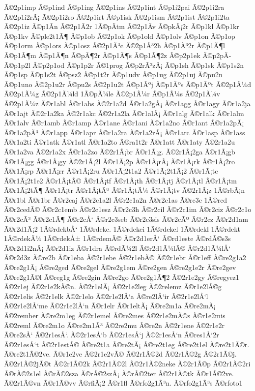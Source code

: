 {Ã©2p1imp
Ã©p1ind
Ã©p1ing
Ã©2p1ins
Ã©2p1int
Ã©p1i2pai
Ã©2p1i2ra
Ã©2p1i2rÃ¡
Ã©2p1i2ro
Ã©2p1irt
Ã©p1isk
Ã©2p1ism
Ã©2p1ist
Ã©2p1i2ta
Ã©2p1iz
Ã©p1Ã­n
Ã©2p1Ã­2r
1Ã©pÃ­tm
Ã©2p1Ã­v
Ã©pkÃ¡2r
Ã©p1kl
Ã©p1kr
Ã©p1kv
Ã©ple2t1Ã¶
Ã©p1ob
Ã©2p1ok
Ã©p1old
Ã©p1olv
Ã©p1on
Ã©p1op
Ã©p1orm
Ã©p1ors
Ã©p1osz
Ã©2p1Ã³c
Ã©2p1Ã³2h
Ã©p1Ã³2r
Ã©p1Ã¶l
Ã©p1Ã¶m
Ã©p1Ã¶n
Ã©pÃ¶2r
Ã©p1Ã¶s
Ã©p1Ã¶2z
Ã©p2p1ek
Ã©p2pÃ­
Ã©p1p2l
Ã©p2p1od
Ã©p1p2r
Ã©1prog
Ã©p2rÃ³zÃ¡
Ã©p1sh
Ã©p1sk
Ã©p1s2n
Ã©p1sp
Ã©p1s2t
Ã©psz2
Ã©p1t2r
Ã©p1udv
Ã©p1ug
Ã©2p1uj
Ã©pu2n
Ã©p1uno
Ã©2p1u2r
Ã©pu2s
Ã©2p1u2t
Ã©p1Ãºj
Ã©p1Ãºs
Ã©p1Ãºt
Ã©2p1Ã¼d
Ã©2p1Ã¼g
Ã©2p1Ã¼ld
1Ã©pÃ¼le
Ã©2p1Ã¼r
Ã©p1Ã¼s
Ã©2p1Ã¼v
Ã©2p1Ã¼z
Ã©r1abl
Ã©r1abs
Ã©2r1a2d
Ã©r1a2gÃ¡
Ã©r1agg
Ã©r1agy
Ã©r1a2ja
Ã©r1ajt
Ã©2r1a2ka
Ã©2r1akc
Ã©2r1a2la
Ã©r1alÃ¡
Ã©r1alg
Ã©r1alk
Ã©r1alm
Ã©r1alv
Ã©r1amb
Ã©r1amp
Ã©r1ane
Ã©r1ani
Ã©r1a2no
Ã©r1ant
Ã©r1a2pÃ¡
Ã©r1a2pÃ³
Ã©r1app
Ã©r1apr
Ã©r1a2ra
Ã©r1a2rÃ¡
Ã©r1arc
Ã©r1asp
Ã©r1ass
Ã©r1a2ti
Ã©r1atk
Ã©r1atl
Ã©r1a2to
Ã©ra1t2r
Ã©r1att
Ã©r1aty
Ã©2r1a2u
Ã©r1a2va
Ã©2r1a2x
Ã©r1a2zo
Ã©2r1Ã¡br
Ã©r1Ã¡g.
Ã©2r1Ã¡2ga
Ã©r1Ã¡gb
Ã©r1Ã¡gg
Ã©r1Ã¡gy
Ã©2r1Ã¡2l
Ã©r1Ã¡2p
Ã©r1Ã¡rÃ¡
Ã©r1Ã¡rk
Ã©r1Ã¡2ro
Ã©r1Ã¡rp
Ã©r1Ã¡rr
Ã©r1Ã¡2ru
Ã©r1Ã¡2t1a2
Ã©r1Ã¡2t1Ã¡2
Ã©r1Ã¡tc
Ã©r1Ã¡2t1e2
Ã©r1Ã¡tÃ©
Ã©r1Ã¡tf
Ã©r1Ã¡th
Ã©r1Ã¡tj
Ã©r1Ã¡tl
Ã©r1Ã¡tm
Ã©r1Ã¡2tÃ¶
Ã©r1Ã¡tr
Ã©r1Ã¡tÃº
Ã©r1Ã¡tÃ¼
Ã©r1Ã¡tv
Ã©2r1Ã¡z
1Ã©rbÃ¡n
Ã©r1bl
Ã©r1br
Ã©r2caj
Ã©r2c1a2l
Ã©r2c1a2n
Ã©r2c1as
Ã©rc3c
1Ã©rcd
Ã©r2cedÃ©
Ã©r2c1emb
Ã©r2c1esz
Ã©r2c3h
Ã©r2cil
Ã©r2c1im
Ã©r2ciz
Ã©r2c1o
Ã©r2cÃ³
Ã©r2c1Ã¶
Ã©r2cÅ‘
Ã©r2c3seb
Ã©r2c3sis
Ã©r2cÃº
Ã©r2cz
Ã©r2d1am
Ã©r2d1Ã¡2
1Ã©rdekbÅ‘
1Ã©rdeke.
1Ã©rdekei
1Ã©rdekel
1Ã©rdekl
1Ã©rdekt
1Ã©rdekÃ¼
1Ã©rdekÅ±
1Ã©rdemÃ©
Ã©r2d1erÅ‘
Ã©rd1este
Ã©rdÃ©s3s
Ã©r2d1i2nÃ¡
Ã©r2d1iz
Ã©r1dra
Ã©rdÃ¼2l
Ã©r2d1Ã¼lÃ©
Ã©r2d1Ã¼lÅ‘
Ã©r2d3z
Ã©re2b
Ã©r1eba
Ã©2r1ebe
Ã©2r1ebÃ©
Ã©2r1ebr
Ã©r1eff
Ã©re2g1a2
Ã©re2g1Ã¡
Ã©re2ged
Ã©re2gel
Ã©re2g1em
Ã©re2gen
Ã©re2g1e2r
Ã©re2gev
Ã©re2g1Ã©l
Ã©reg1g
Ã©re2gin
Ã©re2go
Ã©re2g1Ã¶2
Ã©2r1e2gy
Ã©regyez1
Ã©2r1ej
Ã©2r1e2kÃ©n.
Ã©2r1elÃ¡
Ã©2r1e2leg
Ã©2relemz
Ã©r1e2lÃ©g
Ã©2r1elis
Ã©2r1elk
Ã©2r1elo
Ã©2r1e2lÅ‘a
Ã©re2lÅ‘ir
Ã©2r1e2lÅ‘l
Ã©2r1e2lÅ‘me
Ã©2r1e2lÅ‘n
Ã©r1elr
Ã©r1eltÃ¡
Ã©re2m1a
Ã©re2mÃ¡
Ã©2rember
Ã©re2m1eg
Ã©2r1emel
Ã©re2mes
Ã©2r1e2mÃ©s
Ã©r1e2mis
Ã©2reml
Ã©re2m1o
Ã©re2m1Ã³
Ã©2re2mu
Ã©re2n
Ã©2r1ene
Ã©2r1e2r
Ã©re2sÅ‘
Ã©2r1esÅ‘.
Ã©2r1esÅ‘b
Ã©2r1esÅ‘j
Ã©2r1esÅ‘n
Ã©res1Å‘2r
Ã©2r1esÅ‘t
Ã©2r1estÃ©
Ã©re2t1a
Ã©re2tÃ¡
Ã©re2t1eg
Ã©re2t1el
Ã©re2t1Ã©r.
Ã©re2t1Ã©2ve.
Ã©r1e2ve
Ã©2r1e2vÃ©
Ã©2r1Ã©2d
Ã©2r1Ã©2g
Ã©2r1Ã©j.
Ã©2r1Ã©2jÃ©t
Ã©2r1Ã©2k
Ã©2r1Ã©2l
Ã©2r1Ã©2neke
Ã©2r1Ã©p
Ã©2r1Ã©2ri
Ã©rÃ©2s1el
Ã©rÃ©2sza
Ã©rÃ©2szÃ¡
Ã©rÃ©2ter
Ã©2r1Ã©tk
Ã©r1Ã©2ve.
Ã©2r1Ã©vn
Ã©r1Ã©vv
Ã©rfiÃ¡2
Ã©r1fl
Ã©rfo2g1Ã³n.
Ã©rfo2g1Ã³s
Ã©rfoto1
}
